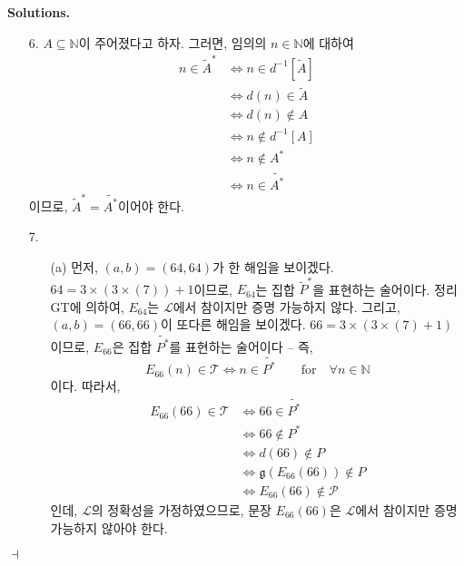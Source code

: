 \documentclass[12pt]{paper}
\newcommand{\gnum}
{ \mathfrak{g}
}
\newenvironment{context}[1][]
{ \noindent \textbf{{#1}.}
}
{ \hfill $ \dashv $
}
\begin{document}
\begin{context}[Solutions]
\begin{enumerate}
      \item[{6.}] $A \subseteq \mathbb{N}$이 주어졌다고 하자.
      그러면, 임의의 $n \in \mathbb{N}$에 대하여
      \begin{align*}
        n \in \tilde{A}^{*}
        & \iff n \in d^{-1} \left[ \tilde{A} \right] \\
        & \iff d \left( n \right) \in \tilde{A} \\
        & \iff d \left( n \right) \notin A \\
        & \iff n \notin d^{-1} \left[ A \right] \\
        & \iff n \notin A^{*} \\
        & \iff n \in \widetilde{A^{*}}
      \end{align*}
      이므로, $\tilde{A}^{*} = \widetilde{A^{*}}$이어야 한다.

      \item[{7.}]
      \begin{itemize}
        \item[(a)] 먼저, $\left( a , b \right) = \left( 64 , 64 \right)$가 한 해임을 보이겠다. 
        $64 = 3 \times \left( 3 \times \left( 7 \right) \right) + 1$이므로,
        $E_{64}$는 집합 $\tilde{P}^{*}$을 표현하는 술어이다.
        정리 GT에 의하여, $E_{64}$는 $\mathcal{L}$에서 참이지만 증명 가능하지 않다.
        그리고, $\left( a , b \right) = \left( 66 , 66 \right)$이 또다른 해임을 보이겠다.
        $66 = 3 \times \left( 3 \times \left( 7 \right) + 1 \right)$이므로,
        $E_{66}$은 집합 $\widetilde{P^{*}}$를 표현하는 술어이다 --
        즉, $$ E_{66} \left( n \right) \in \mathcal{T} \iff n \in \widetilde{P^{*}} \qquad \mathrm{for} \quad \forall n \in \mathbb{N} $$이다.
        따라서,
        \begin{align*}
          E_{66} \left( 66 \right) \in \mathcal{T}
          & \iff 66 \in \widetilde{P^{*}} \\
          & \iff 66 \notin P^{*} \\
          & \iff d \left( 66 \right) \notin P \\
          & \iff \gnum \left( E_{66} \left( 66 \right) \right) \notin P \\
          & \iff E_{66} \left( 66 \right) \notin \mathcal{P}
        \end{align*}
        인데, $\mathcal{L}$의 정확성을 가정하였으므로,
        문장 $E_{66} \left( 66 \right)$은 $\mathcal{L}$에서 참이지만 증명 가능하지 않아야 한다.


\end{itemize}
\end{enumerate}
\end{context}
\end{document}
